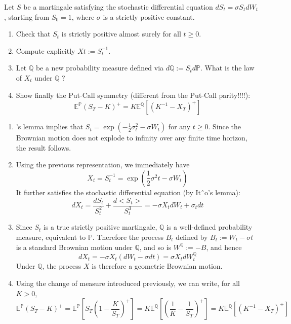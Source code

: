 \documentclass[12pt,a4paper]{exam}
\begin{document}
\begin{questions}
\question Let $S$ be a martingale satisfying the stochastic differential equation $dS_t = \sigma S_t dW_t$, starting from $S_0 = 1$,
where $\sigma$ is a strictly positive constant.
\begin{enumerate}[label=(\alph*),font=\itshape]
\item Check that $S_t$ is strictly positive almost surely for all $t \geq 0$.
\item Compute explicitly $Xt := S_t^{-1}$.
\item Let $\mathbb{Q}$ be a new probability measure defined via $d\mathbb{Q} := S_t d\mathbb{P}$. What is the law of $X_t$ under $\mathbb{Q}$ ? 
\item Show finally the Put-Call symmetry (different from the Put-Call parity!!!!):
\begin{equation*}
\mathbb{E}^{\mathbb{P}}(S_T-K)^+ = K\mathbb{E}^{\mathbb{Q}}\left[(K^{-1}-X_T)^+\right]
\end{equation*}
\end{enumerate}
\fillwithlines{3cm}

\begin{solution}
\begin{enumerate}[label=(\alph*),font=\itshape]
\item \ito’s lemma implies that $S_t = \exp (-\frac{1}{2}\sigma^2_t - \sigma W_t)$ for any $t \geq 0$. Since the Brownian motion does not
explode to infinity over any finite time horizon, the result follows.
\item Using the previous representation, we immediately have
\begin{equation*}
X_t = S_t^{-1} = \exp\left(\frac{1}{2}\sigma^2 t - \sigma W_t\right)
\end{equation*}
It further satisfies the stochastic differential equation (by Itˆo’s lemma):
\begin{equation*}
dX_t = \frac{dS_t}{S_t^2} + \frac{d<S_t>}{S_t^3} = -\sigma X_t dW_t + \sigma_t dt
\end{equation*}
\item Since $S_t$ is a true strictly positive martingale, $\mathbb{Q}$ is a well-defined probability measure, equivalent to $\mathbb{P}$.
Therefore the process $B_t$ defined by $B_t := W_t - \sigma t$ is a standard Brownian motion under $\mathbb{Q}$, and so is $W^{\mathbb{Q}} := -B$, and hence 
\begin{equation*}
dX_t = -\sigma X_t(dW_t - \sigma dt) = \sigma X_t dW_t^{\mathbb{Q}}
\end{equation*}
Under $\mathbb{Q}$, the process $X$ is therefore a geometric Brownian motion.
\item Using the change of measure introduced previously, we can write, for all $K>0$,
\begin{equation*}
\mathbb{E}^{\mathbb{P}}(S_T-K)^+ = \mathbb{E}^{\mathbb{P}}\left[S_T\left(1-\frac{K}{S_T}\right)^+\right] = K \mathbb{E}^{\mathbb{Q}}\left[\left(\frac{1}{K}-\frac{1}{S_T}\right)^+\right] = K\mathbb{E}^{\mathbb{Q}}\left[(K^{-1}-X_T)^+\right]
\end{equation*}
\end{enumerate}
\end{solution}


\end{questions}
\end{document}
